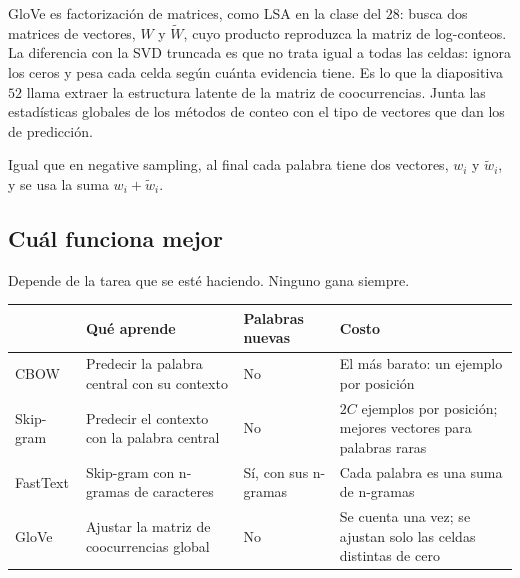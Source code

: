 \documentclass[11pt,letterpaper]{article}
\begin{document}
\begin{idea}
    GloVe es factorización de matrices, como LSA en la clase del $28$:
    busca dos matrices de vectores, $W$ y $\tilde{W}$, cuyo producto
    reproduzca la matriz de log-conteos. La diferencia con la SVD
    truncada es que no trata igual a todas las celdas: ignora los ceros
    y pesa cada celda según cuánta evidencia tiene. Es lo que la
    diapositiva $52$ llama extraer la estructura latente de la matriz
    de coocurrencias. Junta las estadísticas globales de los métodos de
    conteo con el tipo de vectores que dan los de predicción.
\end{idea}

Igual que en negative sampling, al final cada palabra tiene dos
vectores, $w_i$ y $\tilde{w}_i$, y se usa la suma
$w_i + \tilde{w}_i$.


\subsection*{Cuál funciona mejor}

Depende de la tarea que se esté haciendo. Ninguno gana siempre.

\begin{center}
\small
\begin{tabular}{l>{\raggedright\arraybackslash}p{4.4cm}%
                 >{\raggedright\arraybackslash}p{2.6cm}%
                 >{\raggedright\arraybackslash}p{5.2cm}}
    \toprule
    & \textbf{Qué aprende} & \textbf{Palabras nuevas}
    & \textbf{Costo} \\
    \midrule
    CBOW & Predecir la palabra central con su contexto & No
         & El más barato: un ejemplo por posición \\
    Skip-gram & Predecir el contexto con la palabra central & No
         & $2C$ ejemplos por posición; mejores vectores para
           palabras raras \\
    FastText & Skip-gram con n-gramas de caracteres
         & Sí, con sus n-gramas
         & Cada palabra es una suma de n-gramas \\
    GloVe & Ajustar la matriz de coocurrencias global & No
         & Se cuenta una vez; se ajustan solo las celdas distintas de
           cero \\
    \bottomrule
\end{tabular}
\end{center}
\end{document}
